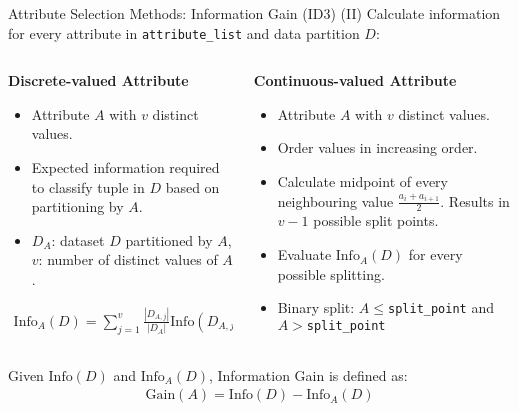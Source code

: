 \begin{frame}{Attribute Selection Methods: Information Gain (ID3) (II)}
	Calculate information for every attribute in \texttt{attribute\_list} and data partition $D$:
	\vspace*{-1.5em}
	\begin{columns}
		\begin{column}{0.5\textwidth}
			\begin{center}
				\textbf{Discrete-valued Attribute}
			\end{center}
			\vspace*{-1em}
			\begin{itemize}
				\item Attribute $A$ with $v$ distinct values.
				\item Expected information required to classify tuple in $D$ based on partitioning by $A$.
				\item $D_A$: dataset $D$ partitioned by $A$, $v$: number of distinct values of $A$.
			\end{itemize}
			\vspace*{-1em}
			\begin{align*}
				\text{Info}_A(D) = \sum_{j=1}^v \frac{|D_{A,j}|}{|D_A|} \text{Info}(D_{A,j})
			\end{align*}
		\end{column}

		\begin{column}{0.5\textwidth}
			\begin{center}
				\textbf{Continuous-valued Attribute}
			\end{center}
			\vspace*{-1em}

			\begin{itemize}
				\item Attribute $A$ with $v$ distinct values.
				\item Order values in increasing order.
				\item Calculate midpoint of every neighbouring value
				      $\frac{a_i + a_{i+1}}{2}$. Results in $v-1$ possible split points.
				\item Evaluate $\text{Info}_A(D)$ for every possible splitting.
				\item Binary split: $A\leq$\texttt{split\_point} and  $A>$\texttt{split\_point}
			\end{itemize}
		\end{column}
	\end{columns}
	\vspace*{.5em}
	Given $\text{Info}(D)$ and $\text{Info}_A(D)$, Information Gain is defined as:
	\begin{align*}
		\text{Gain}(A) = \text{Info}(D) - \text{Info}_A(D)
	\end{align*}
\end{frame}

